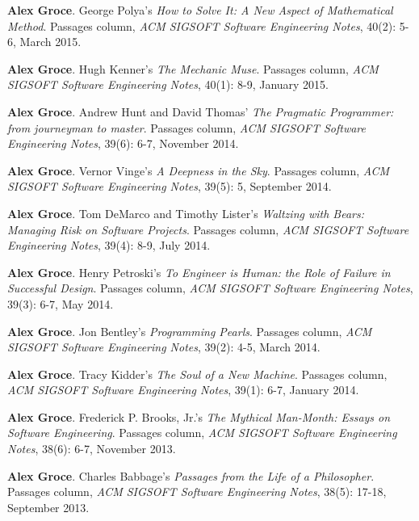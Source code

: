 \documentclass[ComputerScience]{vita}
\begin{document}
\begin{vita}
\begin{Columns, Book Reviews, and Magazine Articles}
\item{\bf Alex Groce}.
\newblock George Polya's \emph{How to Solve It: A New Aspect of Mathematical Method}.
\newblock Passages column, \emph{ACM SIGSOFT Software Engineering Notes}, 40(2): 5-6, March 2015.

\item {\bf Alex Groce}.
\newblock Hugh Kenner's \emph{The Mechanic Muse}.
\newblock Passages column, \emph{ACM SIGSOFT Software Engineering Notes}, 40(1): 8-9, January 2015.

\item {\bf Alex Groce}.
\newblock Andrew Hunt and David Thomas' \emph{The Pragmatic Programmer: from journeyman to master}.
\newblock Passages column, \emph{ACM SIGSOFT Software Engineering Notes}, 39(6): 6-7, November 2014.

\item {\bf Alex Groce}.
\newblock Vernor Vinge's \emph{A Deepness in the Sky}.
\newblock Passages column, \emph{ACM SIGSOFT Software Engineering Notes}, 39(5): 5, September 2014.

\item {\bf Alex Groce}.
\newblock Tom DeMarco and Timothy Lister's \emph{Waltzing with Bears: Managing Risk on Software Projects}.
\newblock Passages column, \emph{ACM SIGSOFT Software Engineering Notes}, 39(4): 8-9, July 2014.

\item {\bf Alex Groce}.
\newblock Henry Petroski's \emph{To Engineer is Human: the Role of Failure in Successful Design}.
\newblock Passages column, \emph{ACM SIGSOFT Software Engineering Notes}, 39(3): 6-7, May 2014.

\item {\bf Alex Groce}.
\newblock Jon Bentley's \emph{Programming Pearls}.
\newblock Passages column, \emph{ACM SIGSOFT Software Engineering Notes}, 39(2): 4-5, March 2014.

\item {\bf Alex Groce}.
\newblock Tracy Kidder's \emph{The Soul of a New Machine}.
\newblock Passages column, \emph{ACM SIGSOFT Software Engineering Notes}, 39(1): 6-7, January 2014.

\item {\bf Alex Groce}.
\newblock Frederick P. Brooks, Jr.'s \emph{The Mythical Man-Month: Essays on Software Engineering}.
\newblock Passages column, \emph{ACM SIGSOFT Software Engineering Notes}, 38(6): 6-7, November 2013.

\item {\bf Alex Groce}.
\newblock Charles Babbage's \emph{Passages from the Life of a Philosopher}.
\newblock Passages column, \emph{ACM SIGSOFT Software Engineering Notes}, 38(5): 17-18, September 2013.
\end{Columns, Book Reviews, and Magazine Articles}


\end{vita}
\end{document}
